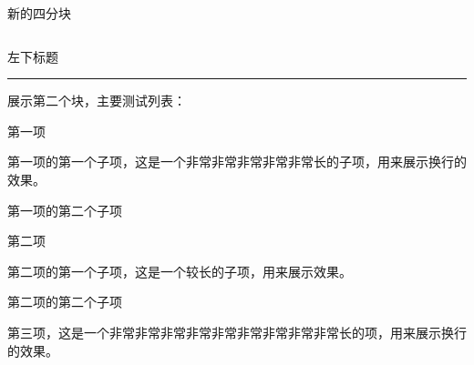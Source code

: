 \documentclass[aspectratio=169]{beamer}
\begin{document}
\begin{frame}{新的四分块}
\begin{columns}[t]
\begin{column}{0.5\textwidth}
            \vspace{1em}

            \begin{minipage}{\linewidth}
                \fbtitlefont
                左下标题\par
                \vspace{-0.5em}
                \textcolor{uestc}{\rule{\linewidth}{0.5pt}}\par
                \vspace{0.5em}
                \fbfont %
                展示第二个块，主要测试列表：
                \begin{el}
                    \item 第一项
                    \begin{il}
                        \item 第一项的第一个子项，这是一个非常非常非常非常非常长的子项，用来展示换行的效果。
                        \item 第一项的第二个子项
                    \end{il}
                    \item 第二项
                    \begin{il}
                        \item 第二项的第一个子项，这是一个较长的子项，用来展示效果。
                        \item 第二项的第二个子项
                    \end{il}
                    \item 第三项，这是一个非常非常非常非常非常非常非常非常非常长的项，用来展示换行的效果。
                \end{el}
            \end{minipage}
        \end{column}
        

\end{columns}
\end{frame}
\end{document}
